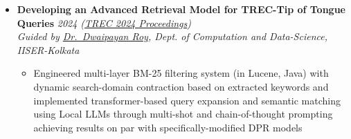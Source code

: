 \documentclass[a4paper,10pt]{article}
\newcommand{\resumeProject}[4]{
    \item\small{
        \textbf{#1} \hfill \textit{#2}\\
        \textit{#3}\\
        \begin{itemize}[leftmargin=1.5em,label=\textbullet,nosep,itemsep=0.5pt]
            #4
        \end{itemize}
    }\vspace{2pt}
}
\begin{document}
{\begin{itemize}[leftmargin=*,label={},itemsep=4pt]
     


    \resumeProject{Developing an Advanced Retrieval Model for TREC-Tip of Tongue Queries}{2024 (\href{https://trec.nist.gov/pubs/trec33/papers/IISER-K.tot.pdf}{TREC 2024 Proceedings})}
    {Guided by \href{https://dwaipayanroy.github.io/}{Dr.\ Dwaipayan Roy}, Dept. of Computation and Data-Science, IISER-Kolkata}
    {\item Engineered multi-layer BM-25 filtering system (in Lucene, Java) with dynamic search-domain contraction based on extracted keywords and implemented transformer-based query expansion and semantic matching using Local LLMs through multi-shot and chain-of-thought prompting achieving results on par with specifically-modified DPR models}
     
\end{itemize}
}
\end{document}

